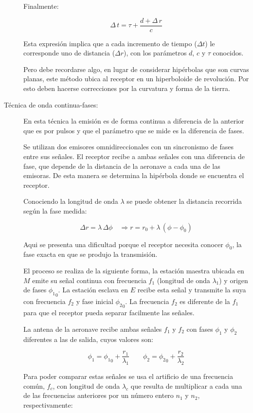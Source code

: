 \begin{description}
Finalmente:

\[
\Delta\,t = \tau+\frac{d+\Delta\,r}{c}
\]

Esta expresi\'on implica que a cada incremento de tiempo ($\Delta t$) le corresponde uno de distancia ($\Delta r$), con los par\'ametros $d$, $c$ y $\tau$ conocidos.

Pero debe recordarse algo, en lugar de considerar hip\'erbolas que son curvas planas, este m\'etodo ubica al receptor en un hiperboloide de revoluci\'on. Por esto deben hacerse correcciones por la curvatura y forma de la tierra.


\item [T\'ecnica de onda continua-fases:]

En esta t\'ecnica la emisi\'on es de forma continua a diferencia de la anterior que es por pulsos y que el par\'ametro que se mide es la diferencia de fases.

Se utilizan dos emisores omnidireccionales con un sincronismo de fases entre sus se\~nales. El receptor recibe a ambas se\~nales con una diferencia de fase, que depende de la distancia de la aeronave a cada una de las emisoras. De esta manera se determina la hip\'erbola donde se encuentra el receptor.

Conociendo la longitud de onda $\lambda$ se puede obtener la distancia recorrida seg\'un la fase medida: 

\[\Delta r = \lambda \,\Delta \phi \quad \Longrightarrow r = r_0 +\lambda \,\left( \phi - \phi_0 \right) \]

Aqui se presenta una dificultad porque el receptor necesita conocer $ \phi_0$, la fase exacta en que se produjo la transmisi\'on.

El proceso se realiza de la siguiente forma, la estaci\'on maestra ubicada en $M$ emite su se\~nal continua con frecuencia $f_1$ (longitud de onda $\lambda_1$) y origen de fases $ {\phi_1}_0$. La estaci\'on esclava en $E$ recibe esta se\~nal y transmite la suya con frecuencia $f_2$ y fase inicial $ {\phi_2}_0$. La frecuencia $f_2$ es diferente de la $f_1$ para que el receptor pueda separar facilmente las se\~nales.

La antena de la aeronave recibe ambas se\~nales $f_1$ y $f_2$ con fases $\phi_1$ y $\phi_2$ diferentes a las de salida, cuyos valores son:

\[
\phi_1 = {\phi_1}_0 + \displaystyle \frac{r_1}{\lambda_1} \qquad
\phi_2 = {\phi_2}_0 + \displaystyle \frac{r_2}{\lambda_2} 
\]

Para poder comparar estas se\~nales se usa el artificio de una frecuencia com\'un, $f_c$, con longitud de onda $\lambda_c$ que resulta de multiplicar a cada una de las frecuencias anteriores por un n\'umero entero $n_1$ y $n_2$, respectivamente:


\end{description}
